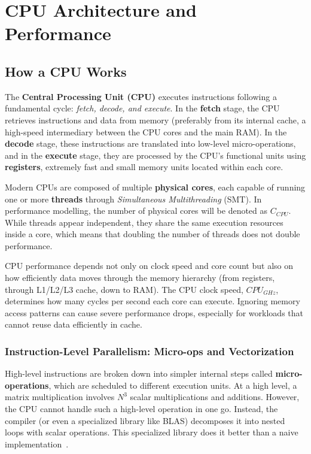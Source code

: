 
\chapter{CPU Architecture and Performance}
\label{ch::chapter3}

\vspace{-1cm}

\section{How a CPU Works}

The \textbf{Central Processing Unit (CPU)} executes instructions following a fundamental cycle: \textit{fetch, decode, and execute}. In the \textbf{fetch} stage, the CPU retrieves instructions and data from memory (preferably from its internal cache, a high-speed intermediary between the CPU cores and the main RAM). In the \textbf{decode} stage, these instructions are translated into low-level micro-operations, and in the \textbf{execute} stage, they are processed by the CPU’s functional units using \textbf{registers}, extremely fast and small memory units located within each core.

Modern CPUs are composed of multiple \textbf{physical cores}, each capable of running one or more \textbf{threads} through \textit{Simultaneous Multithreading} (SMT).  
In performance modelling, the number of physical cores will be denoted as $C_{CPU}$.  
While threads appear independent, they share the same execution resources inside a core, which means that doubling the number of threads does not double performance.

CPU performance depends not only on clock speed and core count but also on how efficiently data moves through the memory hierarchy (from registers, through L1/L2/L3 cache, down to RAM).  
The CPU clock speed, $CPU_{GHz}$, determines how many cycles per second each core can execute.  
Ignoring memory access patterns can cause severe performance drops, especially for workloads that cannot reuse data efficiently in cache.

\subsection{Instruction-Level Parallelism: Micro-ops and Vectorization}

High-level instructions are broken down into simpler internal steps called \textbf{micro-operations}, which are scheduled to different execution units. At a high level, a matrix multiplication involves $N^3$ scalar multiplications and additions.
However, the CPU cannot handle such a high-level operation in one go. Instead, the
compiler (or even a specialized library like BLAS) decomposes it into nested loops
with scalar operations. This specialized library does it better than a naive implementation~\cite{matrixmultiplication}.

